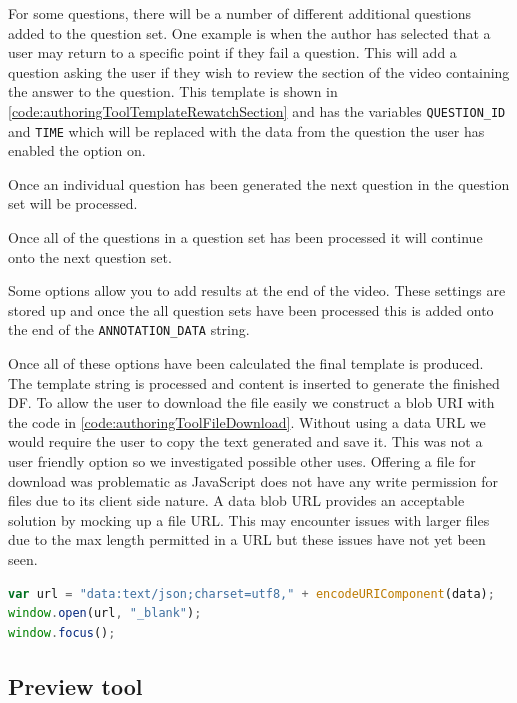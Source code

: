 For some questions, there will be a number of different additional questions added to the question set. One example is when the author has selected that a user may return to a specific point if they fail a question. This will add a question asking the user if they wish to review the section of the video containing the answer to the question. This template is shown in \autoref{code:authoringToolTemplateRewatchSection} and has the variables \lstinline|QUESTION_ID| and \lstinline|TIME| which will be replaced with the data from the question the user has enabled the option on.

Once an individual question has been generated the next question in the question set will be processed.

Once all of the questions in a question set has been processed it will continue onto the next question set.

Some options allow you to add results at the end of the video. These settings are stored up and once the all question sets have been processed this is added onto the end of the \lstinline|ANNOTATION_DATA| string.

Once all of these options have been calculated the final template is produced. The template string is processed and content is inserted to generate the finished \gls{DF}. To allow the user to download the file easily we construct a \gls{blob} URI with the code in \autoref{code:authoringToolFileDownload}. Without using a data URL we would require the user to copy the text generated and save it. This was not a user friendly option so we investigated possible other uses. Offering a file for download was problematic as JavaScript does not have any write permission for files due to its client side nature. A data \gls{blob} URL provides an acceptable solution by mocking up a file URL. This may encounter issues with larger files due to the max length permitted in a URL but these issues have not yet been seen.

\begin{lstlisting}[language=javascript,caption={The final \gls{DF} is offered for downloading using a data \gls{blob} URL},label={code:authoringToolFileDownload} ]
var url = "data:text/json;charset=utf8," + encodeURIComponent(data);
window.open(url, "_blank");
window.focus();
\end{lstlisting}

\subsection{Preview tool}

